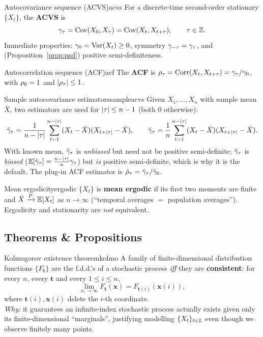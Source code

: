 \begin{definition}{Autocovariance sequence (ACVS)}{acvs}
For a discrete-time second-order stationary $\{X_t\}$, the \textbf{ACVS} is
\[
\gamma_\tau=\operatorname{Cov}(X_0,X_\tau)=\operatorname{Cov}(X_t,X_{t+\tau}),\qquad \tau\in\mathbb{Z} .
\]
Immediate properties: $\gamma_0=\operatorname{Var}(X_t)\ge0$, symmetry $\gamma_{-\tau}=\gamma_\tau$,
and (Proposition~\ref{prop:psd}) positive semi-definiteness.
\end{definition}

\begin{definition}{Autocorrelation sequence (ACF)}{acf}
The \textbf{ACF} is $\rho_\tau=\operatorname{Corr}(X_t,X_{t+\tau})=\gamma_\tau/\gamma_0$, with
$\rho_0=1$ and $\left\lvert \rho_\tau \right\rvert\le1$.
\end{definition}

\begin{definition}{Sample autocovariance estimators}{sampleacvs}
Given $X_1,\dots,X_n$ with sample mean $\bar X$, two estimators are used for
$\left\lvert \tau \right\rvert\le n-1$ (both $0$ otherwise):
\[
\tilde{\gamma}_\tau=\frac{1}{n-\left\lvert \tau \right\rvert}\sum_{t=1}^{n-\left\lvert \tau \right\rvert}(X_t-\bar X)(X_{t+\left\lvert \tau \right\rvert}-\bar X),
\qquad
\hat{\gamma}_\tau=\frac{1}{n}\sum_{t=1}^{n-\left\lvert \tau \right\rvert}(X_t-\bar X)(X_{t+\left\lvert \tau \right\rvert}-\bar X).
\]
With known mean, $\tilde{\gamma}_\tau$ is \emph{unbiased} but need not be
positive semi-definite; $\hat{\gamma}_\tau$ is \emph{biased}
($\mathbb{E}[\hat{\gamma}_\tau]=\tfrac{n-\left\lvert \tau \right\rvert}{n}\gamma_\tau$) but \emph{is} positive
semi-definite, which is why it is the default. The plug-in ACF estimator is
$\hat{\rho}_\tau=\hat{\gamma}_\tau/\hat{\gamma}_0$.
\end{definition}

\begin{definition}{Mean ergodicity}{ergodic}
$\{X_t\}$ is \textbf{mean ergodic} if its first two moments are finite and
$\bar X\xrightarrow{P} \mathbb{E}[X_t]$ as $n\to\infty$ (``temporal averages
$=$ population averages''). Ergodicity and stationarity are \emph{not}
equivalent.
\end{definition}

\subsection{Theorems \& Propositions}

\begin{theorem}{Kolmogorov existence theorem}{kolmo}
A family of finite-dimensional distribution functions $\{F_{\mathbf t}\}$ are
the f.d.d.'s of a stochastic process \emph{iff} they are
\textbf{consistent}: for every $n$, every $\mathbf t$ and every $1\le i\le n$,
\[
\lim_{x_i\to\infty}F_{\mathbf t}(\mathbf x)=F_{\mathbf t(i)}(\mathbf x(i)),
\]
where $\mathbf t(i),\mathbf x(i)$ delete the $i$-th coordinate.\\[2pt]
\textit{Why:} it guarantees an infinite-index stochastic process actually
exists given only its finite-dimensional ``marginals'', justifying modelling
$\{X_t\}_{t\in\mathbb{Z}}$ even though we observe finitely many points.
\end{theorem}

